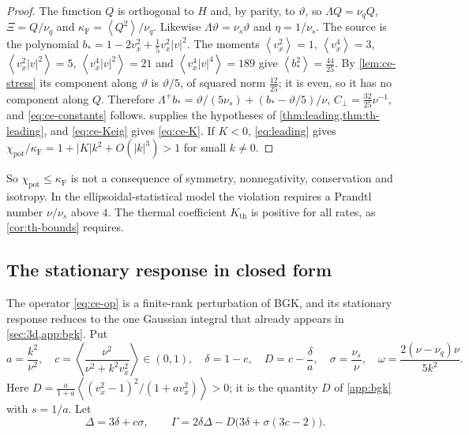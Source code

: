 \documentclass[11pt]{article}
\newcommand{\av}[1]{\left\langle #1\right\rangle}
\newcommand{\F}{\kappa_{\mathrm F}}
\newcommand{\thr}{\mathrm{th}}
\newcommand{\pot}{\mathrm{pot}}
\theoremstyle{definition}
\theoremstyle{remark}
\numberwithin{equation}{section}
\begin{document}
\begin{proof}
The function $Q$ is orthogonal to $H$ and, by parity, to $\vartheta$, so
$\Lambda Q=\nu_qQ$, $\Xi=Q/\nu_q$ and $\F=\av{Q^2}/\nu_q$. Likewise
$\Lambda\vartheta=\nu_s\vartheta$ and $\eta=1/\nu_s$. The source is the
polynomial
$b_*=1-2v_x^2+\tfrac15v_x^2|v|^2$. The moments
$\av{v_x^2}=1$, $\av{v_x^4}=3$, $\av{v_x^2|v|^2}=5$,
$\av{v_x^4|v|^2}=21$ and $\av{v_x^4|v|^4}=189$ give
$\av{b_*^2}=\tfrac{44}{25}$. By \cref{lem:ce-stress} its component along
$\vartheta$ is $\vartheta/5$, of squared norm $\tfrac{12}{25}$; it is
even, so it has no component along $Q$. Therefore
$\Lambda^+b_*=\vartheta/(5\nu_s)+(b_*-\vartheta/5)/\nu$,
$C_\perp=\tfrac{32}{25}\nu^{-1}$, and \eqref{eq:ce-constants} follows.
 supplies the hypotheses of
\cref{thm:leading,thm:th-leading}, and \eqref{eq:ce-Keig} gives
\eqref{eq:ce-K}. If $K<0$, \eqref{eq:leading} gives
$\chi_\pot/\F=1+|K|k^2+O(|k|^3)>1$ for small $k\ne0$.
\end{proof}

So $\chi_\pot\leq\F$ is not a consequence of symmetry, nonnegativity,
conservation and isotropy. In the ellipsoidal-statistical model the
violation requires a Prandtl number $\nu/\nu_s$ above $4$. The thermal
coefficient $K_\thr$ is positive for all rates, as \cref{cor:th-bounds}
requires.

\subsection{The stationary response in closed form}\label{sec:ce-closed}

The operator \eqref{eq:ce-op} is a finite-rank perturbation of BGK, and
its stationary response reduces to the one Gaussian integral that
already appears in \cref{sec:3d,app:bgk}. Put
\[
 a=\frac{k^2}{\nu^2},\quad
 c=\av{\frac{\nu^2}{\nu^2+k^2v_x^2}}\in(0,1),\quad
 \delta=1-c,\quad
 D=c-\frac\delta a,\quad
 \sigma=\frac{\nu_s}\nu,\quad
 \omega=\frac{2(\nu-\nu_q)\nu}{5k^2}.
\]
Here $D=\tfrac{a}{1+a}\av{(v_x^2-1)^2/(1+av_x^2)}>0$; it is the quantity
$D$ of \cref{app:bgk} with $s=1/a$. Let
\[
 \Delta=3\delta+c\sigma,\qquad
 \Gamma=2\delta\Delta-D\bigl(3\delta+\sigma(3c-2)\bigr).
\]
\end{document}
